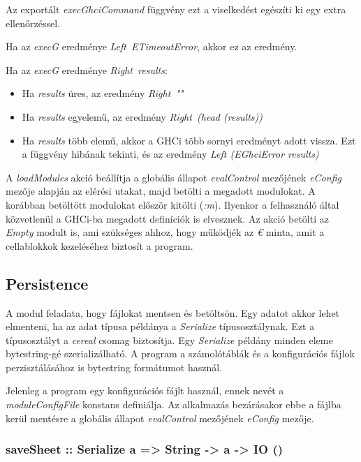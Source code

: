 Az exportált \textit{execGhciCommand} függvény ezt a viselkedést egészíti ki egy extra ellenőrzéssel.
\begin{compactenum}
	\item Ha az \textit{execG} eredménye \textit{Left\ ETimeoutError}, akkor ez az eredmény.
	\item Ha az \textit{execG} eredménye \textit{Right\ results}:
	\begin{itemize}
		\item Ha \textit{results} üres, az eredmény \textit{Right\ ""}
		\item Ha \textit{results} egyelemű, az eredmény \textit{Right\ (head (results))}
		\item Ha \textit{results} több elemű, akkor a GHCi több sornyi eredményt adott vissza. Ezt a függvény hibának tekinti, és az eredmény \textit{Left (EGhciError results)}
	\end{itemize}
\end{compactenum}

A \textit{loadModules} akció beállítja a globális állapot \textit{evalControl} mezőjének \textit{eConfig} mezője alapján az elérési utakat, majd betölti a megadott modulokat. A korábban betöltött modulokat először kitölti (\textit{:m}). Ilyenkor a felhasználó által közvetlenül a GHCi-ba megadott definíciók is elvesznek. Az akció betölti az \textit{Empty} modult is, ami szükséges ahhoz, hogy működjék az \textit{€} minta, amit a cellablokkok kezeléséhez biztosít a program.

\subsection{Persistence}

A modul feladata, hogy fájlokat mentsen és betöltsön. Egy adatot akkor lehet elmenteni, ha az adat típusa példánya a \textit{Serialize} típusosztálynak. Ezt a típusosztályt a \textit{cereal} csomag biztosítja. Egy \textit{Serialize} példány minden eleme bytestring-gé szerializálható. A program a számolótáblák és a konfigurációs fájlok perzisztálásához is bytestring formátumot használ.

Jelenleg a program egy konfigurációs fájlt használ, ennek nevét a \textit{moduleConfigFile} konstans definiálja. Az alkalmazás bezárásakor ebbe a fájlba kerül mentésre a globális állapot \textit{evalControl} mezőjének \textit{eConfig} mezője.

\subsubsection{saveSheet :: Serialize a => String -> a -> IO ()}

